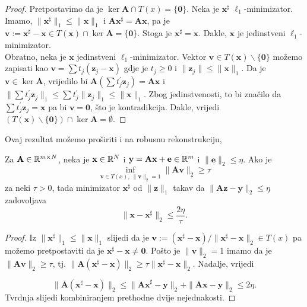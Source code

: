 \documentclass[a4paper,twoside,12pt]{memoir} %
\newcommand{\vect}[1]{\mathbf{#1}}
\renewcommand{\vec}{\vect}
\newcommand{\norm}[1]{\|{#1}\|}
\begin{document}
\begin{proof}
    Pretpostavimo da je $\ker \vec A \cap T(x) = \{\vec 0\}$. Neka je $\vec x^{\sharp}$ $\ell_1$-minimizator. Imamo, $\norm{\vec x^{\sharp}}_1 \leq \norm{\vec x}_1$ i $\vec A \vec x^{\sharp} = \vec{Ax}$, pa je $\vec v := \vec x^{\sharp} - \vec x \in T(\vec x) \cap \ker \vec A = \{\vec 0\}$. Stoga je $\vec x^{\sharp} = \vec x$. Dakle, $\vec x$ je jedinstveni $\ell_1$-minimizator.\\
    \indent
    Obratno, neka je $\vec x$ jedinstveni $\ell_1$-minimizator. Vektor $\vec v \in T(\vec x) \backslash \{\vec 0\}$ mo\v{z}emo zapisati kao $\vec v = \sum t_j (\vec z_j - \vec x)$ gdje je $t_j \geq 0$ i $\norm{\vec z_j} \leq \norm{\vec x}_1$. Da je $\vec v \in \ker \vec A$, vrijedilo bi $\vec A (\sum t_j^{'} \vec z_j) = \vec{Ax}$ i $\norm{\sum t_j^{'} \vec z_j}_1 \leq \sum t_j^{'} \norm{\vec z_j}_1 \leq \norm{\vec x}_1$. Zbog jedinstvenosti, to bi zna\v{c}ilo da $\sum t_j^{'} \vec z_j = \vec x$ pa bi $\vec v = \vec 0$, \v{s}to je kontradikcija. Dakle, vrijedi $(T(\vec x) \backslash \{\vec 0\}) \cap \ker \vec A = \emptyset$. 
\end{proof}
Ovaj rezultat mo\v{z}emo pro\v{s}iriti i na robusnu rekonstrukciju,
\begin{thm}
    Za $\vec A \in \R^{m \times N}$, neka je $\vec x \in \R^N$ i $\vec y = \vec{Ax} + \vec e \in \R^m$ i $\norm{\vec e}_2 \leq \eta$. Ako je
    \begin{equation*}
        \inf_{\vec v \in T(x),\ \norm{\vec v}_2 = 1} \norm{\vec{Av}}_2 \geq \tau
    \end{equation*}
    za neki $\tau > 0$, tada minimizator $\vec x^{\sharp}$ od $\norm{\vec z}_1$ takav da $\norm{\vec{Az} - \vec y}_2 \leq \eta$ zadovoljava
    \begin{equation}\label{4:35}
        \norm{\vec x - \vec x^{\sharp}}_2 \leq \frac{2 \eta}{\tau}. 
    \end{equation}
\end{thm}
\begin{proof}
    Iz $\norm{ \vec x^{\sharp}}_1 \leq \norm{\vec x}_1$ slijedi da je $\vec v := (\vec x^{\sharp} - \vec x)/ \norm{\vec x^{\sharp} - \vec x}_2 \in T(x)$ pa mo\v{z}emo pretpostaviti da je $\vec x^{\sharp} - \vec{x} \neq \vec 0$. Po\v{s}to je $\norm{\vec v}_2 = 1$ imamo da je $\norm{\vec{Av}}_2 \geq \tau$, tj. $\norm{\vec A (\vec x^{\sharp} - \vec x)}_2 \geq \tau \norm{\vec x^{\sharp} - \vec x}_2$. Nadalje, vrijedi
    
    \begin{equation*}
        \norm{\vec A (\vec x^{\sharp} - \vec x)}_2 \leq \norm{\vec{Ax}^{\sharp} - \vec y}_2 + \norm{\vec{Ax} - \vec y}_2 \leq 2 \eta.
    \end{equation*}
    Tvrdnja slijedi kombiniranjem prethodne dvije nejednakosti.
\end{proof}
\end{document}
